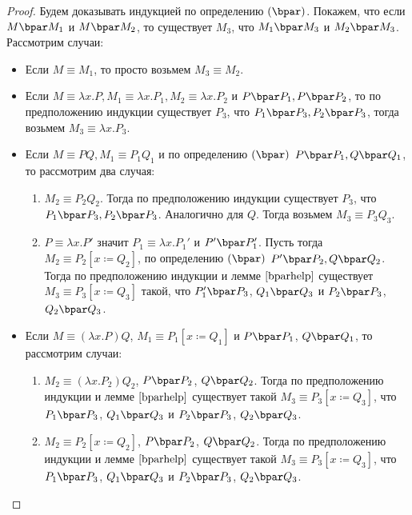 \begin{proof}
	Будем доказывать индукцией по определению $(\bpar)$. Покажем, что если $M \bpar M_1$ и $M \bpar M_2$, то существует ${}M_3$, что $M_1 \bpar M_3$ и $M_2 \bpar M_3$. Рассмотрим случаи:
	\begin{itemize}
		\item Если $M\equiv M_1$, то просто возьмем $M_3\equiv M_2$.
		\item Если $M\equiv \lambda{}x.P, M_1 \equiv \lambda{}x.P_1, M_2 \equiv \lambda{}x.P_2$ и $P \bpar P_1, P \bpar P_2$, то по предположению индукции 
		существует $P_3$, что $P_1 \bpar P_3, P_2 \bpar P_3$, тогда возьмем $M_3\equiv \lambda{}x.P_3$.
		\item Если $M \equiv P Q, M_1 \equiv P_1 Q_1$ и по определению $(\bpar)$ $P \bpar P_1, Q \bpar Q_1$, то рассмотрим два случая:
		\begin{enumerate}
			\item $M_2 \equiv P_2 Q_2$. Тогда по предположению индукции существует $P_3$, что $P_1 \bpar P_3, P_2 \bpar P_3$. Аналогично для $Q$. Тогда возьмем $M_3 \equiv P_3 Q_3$.
			\item $P\equiv \lambda {}x.P'$ значит $P_1 \equiv \lambda{}x.P_1'$ и $ P' \bpar P_1'$. Пусть тогда $ M_2 \equiv P_2[x\coloneqq{} Q_2]$, по определению $(\bpar)$ $P' \bpar P_2, Q \bpar Q_2$. Тогда по предположению индукции и лемме $\ref{bparhelp}$ существует $M_3 \equiv P_3[x \coloneqq Q_3]$ такой, что $ P_1' \bpar P_3 $, $ Q_1 \bpar Q_3 $ и $ P_2 \bpar P_3 $, $ Q_2 \bpar Q_3 $.
		\end{enumerate}
	\item Если $ M \equiv (\lambda{}x.P)Q $, $ M_1 \equiv P_1[x\coloneqq Q_1] $ и $ P \bpar P_1 $, $ Q \bpar Q_1$, то рассмотрим случаи:
	\begin{enumerate}
		\item $ M_2 \equiv (\lambda{}x.P_2)Q_2 $, $P \bpar P_2$, $Q \bpar Q_2$. Тогда по предположению индукции и лемме $ \ref{bparhelp} $ существует такой $ M_3 \equiv P_3[x \coloneqq Q_3] $, что $ P_1 \bpar P_3 $, $ Q_1 \bpar Q_3 $ и $ P_2 \bpar P_3 $, $ Q_2 \bpar Q_3 $.
		\item $ M_2 \equiv P_2[x \coloneqq Q_2]$, $ P \bpar P_2 $, $ Q \bpar Q_2 $. Тогда по предположению индукции и лемме $ \ref{bparhelp} $ существует такой $ M_3 \equiv P_3[x \coloneqq Q_3] $, что $ P_1 \bpar P_3 $, $ Q_1 \bpar Q_3 $ и $ P_2 \bpar P_3 $, $ Q_2 \bpar Q_3 $.
	\end{enumerate}
	\end{itemize}
\end{proof}

